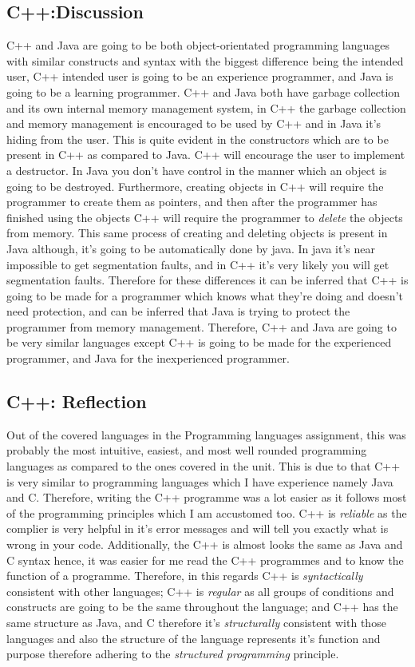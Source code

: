 \documentclass[
	12pt, %
]{fphw}
\begin{document}
\subsection{C++:Discussion}
C++ and Java are going to be both object-orientated programming languages with
similar constructs and syntax with the biggest difference being the intended user,
C++ intended user is going to be an experience programmer, and Java is going to
be a learning programmer. C++ and Java both have garbage collection and its own
internal memory management system, in C++ the garbage collection and memory management
is encouraged to be used by C++ and in Java it's hiding from the user. This is
quite evident in the constructors which are to be present in C++ as compared to Java.
 C++ will encourage the user to implement a destructor. In Java you don't have
control in the manner which an object is going to be destroyed. Furthermore,
creating objects in C++ will require the programmer to create them as pointers,
and then after the programmer has finished using the objects C++ will require the
programmer to \emph{delete} the objects from memory. This same process of creating
and deleting objects is present in Java although, it's going to be automatically
done by java. In java it's near impossible to get segmentation faults, and in C++
it's very likely you will get segmentation faults. Therefore for these differences
it can be inferred that C++ is going to be made for a programmer which knows what
they're doing and doesn't need protection, and can be inferred that Java is trying
to protect the programmer from memory management. Therefore, C++ and Java are
going to be very similar languages except C++ is going to be made for the experienced
programmer, and Java for the inexperienced programmer.


\subsection{C++: Reflection}
Out of the covered languages in the Programming languages assignment, this was
probably the most intuitive, easiest, and most well rounded programming languages as
compared to the ones covered in the unit. This is due to that C++ is very similar
to programming languages which I have experience namely Java and C. Therefore,
writing the C++ programme was a lot easier as it follows most of the programming
principles which I am accustomed too. C++ is \emph{reliable} as the complier is
very helpful in it's error messages and will tell you exactly what is wrong in
your code. Additionally, the C++ is almost looks the same as Java and C syntax hence,
it was easier for me read the C++ programmes and to know the function of a
programme. Therefore, in this regards C++ is \emph{syntactically} consistent with
other languages; C++ is \emph{regular} as all groups of conditions and constructs
are going to be the same throughout the language; and C++ has the same structure
as Java, and C therefore it's \emph{structurally} consistent with those languages
and also the structure of the language represents it's function and purpose therefore
adhering to the \emph{structured programming} principle.\par
\end{document}
